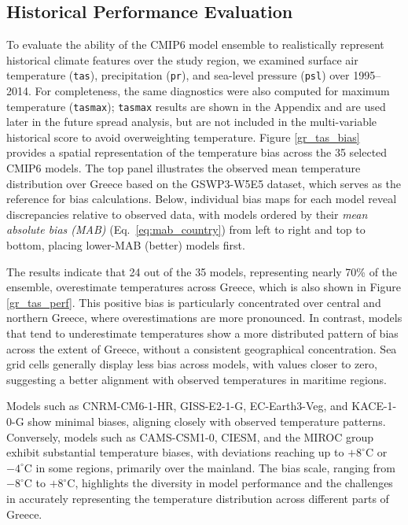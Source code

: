 \documentclass[pdflatex,sn-chicago]{sn-jnl}%
\theoremstyle{thmstyleone}%
\theoremstyle{thmstyletwo}%
\theoremstyle{thmstylethree}%
\begin{document}
\subsection{Historical Performance Evaluation}\label{hist_perf_eval}
To evaluate the ability of the CMIP6 model ensemble to realistically represent historical climate features over the study region, we examined surface air temperature (\texttt{tas}), precipitation (\texttt{pr}), and sea-level pressure (\texttt{psl}) over 1995--2014. For completeness, the same diagnostics were also computed for maximum temperature (\texttt{tasmax}); \texttt{tasmax} results are shown in the Appendix and are used later in the future spread analysis, but are not included in the multi-variable historical score to avoid overweighting temperature. Figure \ref{gr_tas_bias} provides a spatial representation of the temperature bias across the 35 selected CMIP6 models. The top panel illustrates the observed mean temperature distribution over Greece based on the GSWP3-W5E5 dataset, which serves as the reference for bias calculations. Below, individual bias maps for each model reveal discrepancies relative to observed data, with models ordered by their \emph{mean absolute bias (MAB)} (Eq.~\ref{eq:mab_country}) from left to right and top to bottom, placing lower-MAB (better) models first.


The results indicate that 24 out of the 35 models, representing nearly 70\% of the ensemble, overestimate temperatures across Greece, which is also shown in Figure \ref{gr_tas_perf}. This positive bias is particularly concentrated over central and northern Greece, where overestimations are more pronounced. In contrast, models that tend to underestimate temperatures show a more distributed pattern of bias across the extent of Greece, without a consistent geographical concentration. Sea grid cells generally display less bias across models, with values closer to zero, suggesting a better alignment with observed temperatures in maritime regions.

Models such as CNRM-CM6-1-HR, GISS-E2-1-G, EC-Earth3-Veg, and KACE-1-0-G show minimal biases, aligning closely with observed temperature patterns. Conversely, models such as CAMS-CSM1-0, CIESM, and the MIROC group exhibit substantial temperature biases, with deviations reaching up to $+8^{\circ}$C or $-4^{\circ}$C in some regions, primarily over the mainland. The bias scale, ranging from $-8^{\circ}$C to $+8^{\circ}$C, highlights the diversity in model performance and the challenges in accurately representing the temperature distribution across different parts of Greece.
\end{document}
